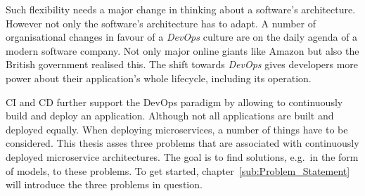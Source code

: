 Such flexibility needs a major change in thinking about a software's
architecture. However not only the software's architecture has to adapt. A
number of organisational changes in favour of a \textit{DevOps} culture are on
the daily agenda of a modern software company. Not only major online giants
like Amazon \autocite{JenkinsVelocityCulture2011} but also the British
government \autocite{LoweLeadingwaymicroservices2016} realised this. The shift
towards \textit{DevOps} gives developers more power about
their application's whole lifecycle, including its operation. 

\acf{CI} and \acf{CD} further support the DevOps paradigm by allowing to
continuously build and deploy an application. Although not all applications are
built and deployed equally. When deploying microservices, a number of things
have to be considered. This thesis asses  three problems that are associated with continuously deployed
microservice architectures. The goal is to find solutions, e.g.\ in the form of
models, to these problems. To get started, chapter~\ref{sub:Problem_Statement}
will introduce the three problems in question.
